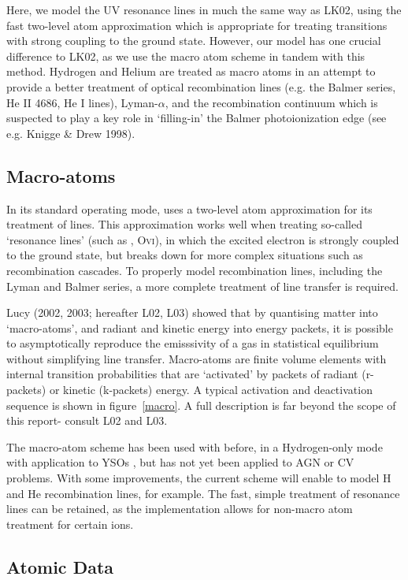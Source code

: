 \documentclass[useAMS,usenatbib, onecolumn]{mn2ejm}
\begin{document}
Here, we 
model the UV resonance lines in much the same way as LK02, using the 
fast two-level atom approximation which is appropriate for treating transitions with strong
coupling to the ground state. However, our model has one crucial difference to LK02, as we use
the macro atom scheme in tandem with this method. Hydrogen and Helium are treated
as macro atoms in an attempt to provide a better treatment of optical recombination lines (e.g. the Balmer series, He II 4686, He I lines),
Lyman-$\alpha$, and the recombination continuum which is suspected to play a key role in `filling-in' the Balmer
photoionization edge (see e.g. Knigge \& Drew 1998). 


\subsection{Macro-atoms}
In its standard operating mode, \py uses a two-level atom approximation \cite[see e.g.][]{mihalas} for its treatment of lines. This approximation works well when treating so-called `resonance lines' (such as \civ, O\textsc{vi}), in which the excited electron is strongly coupled to the ground state, but breaks down for more complex situations such as recombination cascades. To properly model recombination lines, including the Lyman and Balmer series, a more complete treatment of line transfer is required.

Lucy (2002, 2003\nocite{lucy2002, lucy2003}; hereafter L02, L03) showed that by quantising matter into `macro-atoms', and radiant and kinetic energy into energy packets, it is possible to asymptotically reproduce the emisssivity of a gas in statistical equilibrium without simplifying line transfer. Macro-atoms are finite volume elements with internal transition probabilities that are `activated' by packets of radiant (r-packets) or kinetic (k-packets) energy. A typical activation and deactivation sequence is shown in figure~\ref{macro}.
A full description is far beyond the scope of this report- consult L02 and L03. 

The macro-atom scheme has been used with \py before, in a Hydrogen-only mode with application to YSOs \citep{simmacro2005}, but has not yet been applied to AGN or CV problems. With some improvements, the current scheme will enable \py to model H and He recombination lines, for example. The fast, simple treatment of resonance lines 
can be retained, as the \py implementation allows for non-macro atom treatment for certain ions.

\subsection{Atomic Data}
\end{document}
